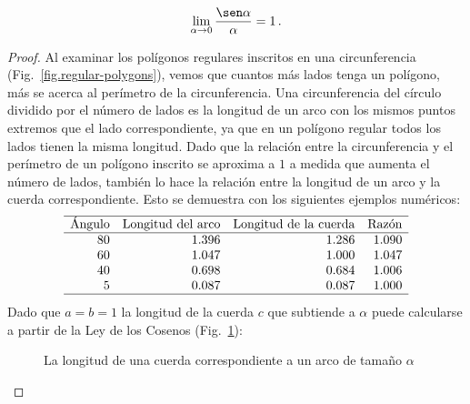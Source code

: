 \begin{theorem}\label{thm.limit-sine-over}
\[
\lim_{\alpha\rightarrow 0}\frac{\sen\alpha}{\alpha}=1\,.
\]
\end{theorem}

\begin{proof}
Al examinar los polígonos regulares inscritos en una circunferencia (Fig.~\ref{fig.regular-polygons}), vemos que cuantos más lados tenga un polígono, más se acerca al perímetro de la circunferencia. Una circunferencia del círculo dividido por el número de lados es la longitud de un arco con los mismos puntos extremos que el lado correspondiente, ya que en un polígono regular todos los lados tienen la misma longitud. Dado que la relación entre la circunferencia y el perímetro de un polígono inscrito se aproxima a $1$ a medida que aumenta el número de lados, también lo hace la relación entre la longitud de un arco y la cuerda correspondiente. Esto se demuestra con los siguientes ejemplos numéricos:
\[
\begin{array}{r@{\hspace{10pt}}r@{\hspace{10pt}}r@{\hspace{10pt}}r}
\hline
\textrm{Ángulo} & \textrm{Longitud del arco} & \textrm{Longitud de la cuerda} & \textrm{Razón}\\\hline
80 & 1.396 & 1.286  & 1.090\\
60 & 1.047 & 1.000  & 1.047\\
40 & 0.698 & 0.684 & 1.006\\
5  & 0.087 & 0.087 &1.000 \\\hline
\end{array}
\]
Dado que $a=b=1$ la longitud de la cuerda $c$ que subtiende a $\alpha$ puede calcularse a partir de la Ley de los Cosenos  (Fig.~\ref{fig.length-of-a-chord}):
\begin{figure}[t]
\begin{center}
\caption{La longitud de una cuerda correspondiente a un arco de tamaño $\alpha$}\label{fig.length-of-a-chord}
\end{center}
\end{figure}

\end{proof}
